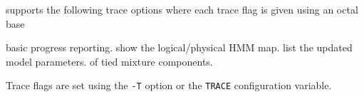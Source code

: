 
 supports the following trace options where each
trace flag is given using an octal base
\begin{optlist}
    basic progress reporting.
    show the logical/physical HMM map.
    list the updated model parameters.
           of tied mixture components.
\end{optlist}


Trace flags are set using the \texttt{-T} option or the  \texttt{TRACE} 
configuration variable.


